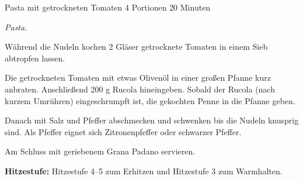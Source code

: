 \begin{recipe}{Pasta mit getrockneten Tomaten} {4 Portionen} {20 Minuten}

  \freeform
  \textit{Pasta.}


  Während die Nudeln kochen 2 Gläser getrocknete Tomaten in einem Sieb abtropfen lassen.

  Die getrockneten Tomaten mit etwas Olivenöl in einer großen Pfanne kurz anbraten.
  Anschließend 200 g Rucola hineingeben.
  Sobald der Rucola (nach kurzem Umrühren) eingeschrumpft ist, die gekochten Penne in die Pfanne geben.

  \newstep
  Danach mit Salz und Pfeffer abschmecken und schwenken bis die Nudeln knusprig sind.
  Als Pfeffer eignet sich Zitronenpfeffer oder schwarzer Pfeffer.

  \newstep
  Am Schluss mit geriebenem Grana Padano servieren.

  \freeform
  \hrulefill

  \freeform
  \textbf{Hitzestufe:}
  Hitzestufe 4–5 zum Erhitzen und Hitzestufe 3 zum Warmhalten.

\end{recipe}
